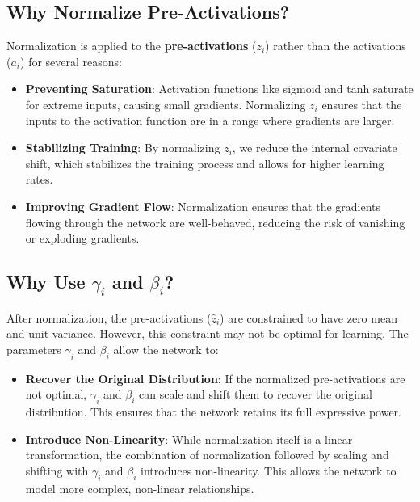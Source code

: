 \begin{notechapter}
\subsection{Why Normalize Pre-Activations?}
Normalization is applied to the \textbf{pre-activations} (\(z_i\)) rather
than the activations (\(a_i\)) for several reasons:

\begin{itemize}
    \item \textbf{Preventing Saturation}:
    Activation functions like sigmoid and tanh saturate for extreme
    inputs, causing small gradients. Normalizing \(z_i\) ensures that
    the inputs to the activation function are in a range where gradients
    are larger.

    \item \textbf{Stabilizing Training}:
    By normalizing \(z_i\), we reduce the internal covariate shift, which
    stabilizes the training process and allows for higher learning rates.

    \item \textbf{Improving Gradient Flow}:
    Normalization ensures that the gradients flowing through the network
    are well-behaved, reducing the risk of vanishing or exploding
    gradients.
\end{itemize}

\subsection{Why Use \(\gamma_i\) and \(\beta_i\)?}
After normalization, the pre-activations (\(\hat{z}_i\)) are constrained
to have zero mean and unit variance. However, this constraint may not
be optimal for learning. The parameters \(\gamma_i\) and \(\beta_i\) allow
the network to:

\begin{itemize}
    \item \textbf{Recover the Original Distribution}:
    If the normalized pre-activations are not optimal, \(\gamma_i\) and
    \(\beta_i\) can scale and shift them to recover the original
    distribution. This ensures that the network retains its full
    expressive power.

    \item \textbf{Introduce Non-Linearity}:
    While normalization itself is a linear transformation, the
    combination of normalization followed by scaling and shifting with
    \(\gamma_i\) and \(\beta_i\) introduces non-linearity. This allows the
    network to model more complex, non-linear relationships.


\end{itemize}
\end{notechapter}
